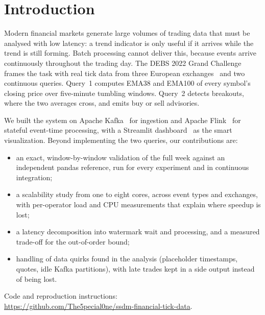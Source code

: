 \documentclass[sigconf]{acmart}
\begin{document}
\maketitle

\section{Introduction}
Modern financial markets generate large volumes of trading data that must be analysed with low latency: a trend indicator is only useful if it arrives while the trend is still forming. Batch processing cannot deliver this, because events arrive continuously throughout the trading day. The DEBS 2022 Grand Challenge~\cite{frischbier2022gc} frames the task with real tick data from three European exchanges~\cite{frischbier2022debs} and two continuous queries. Query~1 computes EMA38 and EMA100 of every symbol's closing price over five-minute tumbling windows. Query~2 detects breakouts, where the two averages cross, and emits buy or sell advisories.

We built the system on Apache Kafka~\cite{kreps2011kafka} for ingestion and Apache Flink~\cite{carbone2015flink} for stateful event-time processing, with a Streamlit dashboard~\cite{streamlit} as the smart visualization. Beyond implementing the two queries, our contributions are:
\begin{itemize}
  \item an exact, window-by-window validation of the full week against an independent pandas reference, run for every experiment and in continuous integration;
  \item a scalability study from one to eight cores, across event types and exchanges, with per-operator load and CPU measurements that explain where speedup is lost;
  \item a latency decomposition into watermark wait and processing, and a measured trade-off for the out-of-order bound;
  \item handling of data quirks found in the analysis (placeholder timestamps, quotes, idle Kafka partitions), with late trades kept in a side output instead of being lost.
\end{itemize}
Code and reproduction instructions:\\\url{https://github.com/The5pecial0ne/ssdm-financial-tick-data}.

\end{document}
